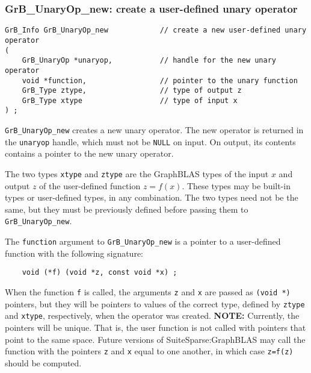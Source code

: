 \documentclass[12pt]{article}
\begin{document}
\subsubsection{{\sf GrB\_UnaryOp\_new:} create a user-defined unary operator}
\label{unaryop_new}

\begin{mdframed}[userdefinedwidth=6in]
{\footnotesize
\begin{verbatim}
GrB_Info GrB_UnaryOp_new            // create a new user-defined unary operator
(
    GrB_UnaryOp *unaryop,           // handle for the new unary operator
    void *function,                 // pointer to the unary function
    GrB_Type ztype,                 // type of output z
    GrB_Type xtype                  // type of input x
) ;
\end{verbatim} }\end{mdframed}

\verb'GrB_UnaryOp_new' creates a new unary operator.  The new operator is
returned in the \verb'unaryop' handle, which must not be \verb'NULL' on input.
On output, its contents contains a pointer to the new unary operator.

The two types \verb'xtype' and \verb'ztype' are the GraphBLAS types of the
input $x$ and output $z$ of the user-defined function $z=f(x)$.  These types
may be built-in types or user-defined types, in any combination.  The two types
need not be the same, but they must be previously defined before passing them
to \verb'GrB_UnaryOp_new'.

The \verb'function' argument to \verb'GrB_UnaryOp_new' is a pointer to a
user-defined function with the following signature:

    {\footnotesize
    \begin{verbatim}
    void (*f) (void *z, const void *x) ; \end{verbatim} }

When the function \verb'f' is called, the arguments \verb'z' and \verb'x' are
passed as \verb'(void *)' pointers, but they will be pointers to values of the
correct type, defined by \verb'ztype' and \verb'xtype', respectively, when the
operator was created.
{\bf NOTE:}
Currently, the pointers will be unique.  That is, the user function is not
called with pointers that point to the same space.  Future versions of
SuiteSparse:GraphBLAS may call the function with the pointers \verb'z' and
\verb'x' equal to one another, in which case \verb'z=f(z)' should be computed.
\end{document}
